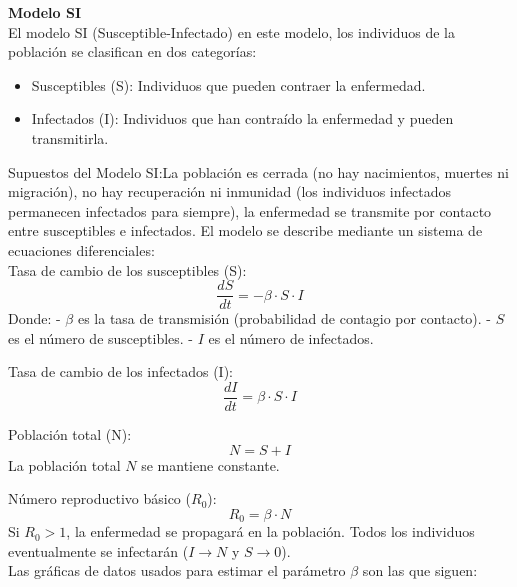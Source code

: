 \textbf{Modelo SI} \\

El modelo SI (Susceptible-Infectado) en este modelo, los individuos de la población se clasifican en dos categorías:
\begin{itemize}
    \item Susceptibles (S): Individuos que pueden contraer la enfermedad.
    \item  Infectados (I): Individuos que han contraído la enfermedad y pueden transmitirla.    
\end{itemize}

Supuestos del Modelo SI:La población es cerrada (no hay nacimientos, muertes ni migración), no hay recuperación ni inmunidad (los individuos infectados permanecen 
infectados para siempre), la enfermedad se transmite por contacto entre susceptibles e infectados. El modelo se describe mediante un sistema de ecuaciones diferenciales: \\

Tasa de cambio de los susceptibles (S): \\
   \[
   \frac{dS}{dt} = -\beta \cdot S \cdot I
   \]
   Donde:
   - \( \beta \) es la tasa de transmisión (probabilidad de contagio por contacto).
   - \( S \) es el número de susceptibles.
   - \( I \) es el número de infectados.

Tasa de cambio de los infectados (I):\\
   \[
   \frac{dI}{dt} = \beta \cdot S \cdot I
   \]

Población total (N): \\
   \[
   N = S + I
   \]
   La población total \( N \) se mantiene constante.

Número reproductivo básico (\( R_0 \)):
   \[
   R_0 = \beta \cdot N
   \]
   Si \( R_0 > 1 \), la enfermedad se propagará en la población. Todos los individuos eventualmente se infectarán (\( I \to N \) y \( S \to 0 \)). \\

   Las gráficas de datos usados para estimar el parámetro $\beta$ son las que siguen:



